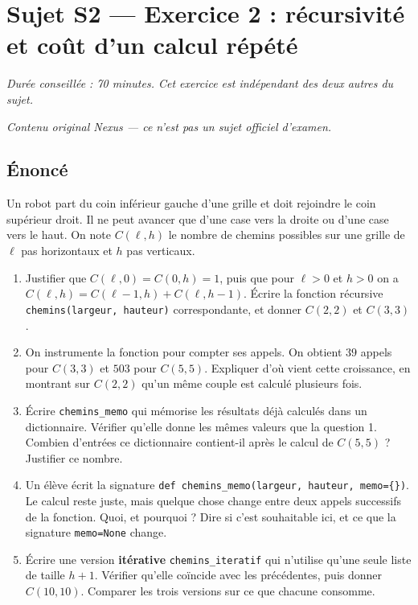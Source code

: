 \section*{Sujet S2 --- Exercice 2 : récursivité et coût d'un calcul répété}

\textit{Durée conseillée : 70 minutes. Cet exercice est indépendant des deux
autres du sujet.}

\medskip
\textit{Contenu original Nexus --- ce n'est pas un sujet officiel d'examen.}

\subsection*{Énoncé}

Un robot part du coin inférieur gauche d'une grille et doit rejoindre le coin
supérieur droit. Il ne peut avancer que d'une case vers la droite ou d'une case
vers le haut. On note $C(\ell, h)$ le nombre de chemins possibles sur une
grille de $\ell$ pas horizontaux et $h$ pas verticaux.

\begin{enumerate}
  \item Justifier que $C(\ell, 0) = C(0, h) = 1$, puis que pour $\ell > 0$ et
    $h > 0$ on a $C(\ell, h) = C(\ell - 1, h) + C(\ell, h - 1)$. Écrire la
    fonction récursive \lstinline{chemins(largeur, hauteur)} correspondante, et
    donner $C(2, 2)$ et $C(3, 3)$.

  \item On instrumente la fonction pour compter ses appels. On obtient $39$
    appels pour $C(3, 3)$ et $503$ pour $C(5, 5)$. Expliquer d'où vient cette
    croissance, en montrant sur $C(2, 2)$ qu'un même couple est calculé
    plusieurs fois.

  \item Écrire \lstinline{chemins_memo} qui mémorise les résultats déjà
    calculés dans un dictionnaire. Vérifier qu'elle donne les mêmes valeurs que
    la question 1. Combien d'entrées ce dictionnaire contient-il après le calcul
    de $C(5, 5)$ ? Justifier ce nombre.

  \item Un élève écrit la signature \lstinline!def chemins_memo(largeur, hauteur, memo={})!.
    Le calcul reste juste, mais quelque chose change entre deux appels
    successifs de la fonction. Quoi, et pourquoi ? Dire si c'est souhaitable
    ici, et ce que la signature \lstinline{memo=None} change.

  \item Écrire une version \textbf{itérative} \lstinline{chemins_iteratif} qui
    n'utilise qu'une seule liste de taille $h + 1$. Vérifier qu'elle coïncide
    avec les précédentes, puis donner $C(10, 10)$. Comparer les trois versions
    sur ce que chacune consomme.
\end{enumerate}

